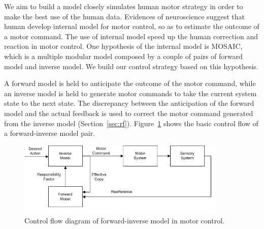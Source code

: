 

We aim to build a model closely simulates human motor strategy in order to make the best use of the human data. Evidences of neuroscience suggest that human develop internal model for motor control, so as to estimate the outcome of a motor command. The use of internal model speed up the human correction and reaction in motor control. One hypothesis of the internal model is MOSAIC, which is a multiple modular model composed by a couple of pairs of forward model and inverse model. We build our control strategy based on this hypothesis.

A forward model is held to anticipate the outcome of the motor command, while an inverse model is held to generate motor commands to take the current system state to the next state. The discrepancy between the anticipation of the forward model and the actual feedback is used to correct the motor command generated from the inverse model (Section~\ref{sec:rf}). Figure~\ref{fig:control} shows the basic control flow of a forward-inverse model pair.

\begin{figure}
  \centering
  \includegraphics[width=10cm]{./fig/control_1.jpg}
  \caption{ \scriptsize{Control flow diagram of forward-inverse model in motor control.}
}
\label{fig:control}
\end{figure}

